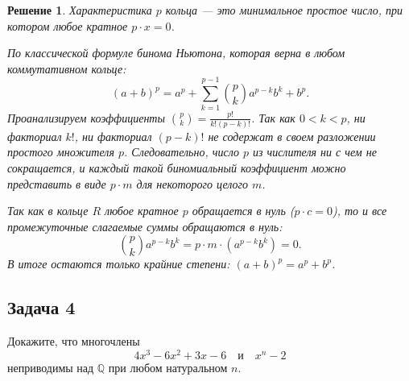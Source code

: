 \documentclass[14pt]{article}
\newtheorem*{solution}{Решение}
\begin{document}
	\begin{solution}
		Характеристика $p$ кольца — это минимальное простое число, при котором любое кратное $p \cdot x = 0$.
		
		По классической формуле бинома Ньютона, которая верна в любом коммутативном кольце:
		\[
		(a+b)^p = a^p + \sum_{k=1}^{p-1}\binom{p}{k}a^{p-k}b^k + b^p.
		\]
		Проанализируем коэффициенты $\binom{p}{k} = \frac{p!}{k!(p-k)!}$. Так как $0 < k < p$, ни факториал $k!$, ни факториал $(p-k)!$ не содержат в своем разложении простого множителя $p$. Следовательно, число $p$ из числителя ни с чем не сокращается, и каждый такой биномиальный коэффициент можно представить в виде $p \cdot m$ для некоторого целого $m$.
		
		Так как в кольце $R$ любое кратное $p$ обращается в нуль ($p \cdot c = 0$), то и все промежуточные слагаемые суммы обращаются в нуль:
		\[
		\binom{p}{k} a^{p-k}b^k = p \cdot m \cdot (a^{p-k}b^k) = 0.
		\]
		В итоге остаются только крайние степени: $(a+b)^p = a^p + b^p$.
	\end{solution}
	
	\subsection*{Задача 4}
	Докажите, что многочлены
	\[
	4x^3 - 6x^2 + 3x - 6 \quad\text{и}\quad x^n - 2
	\]
	неприводимы над $\mathbb Q$ при любом натуральном $n$.
	
\end{document}
